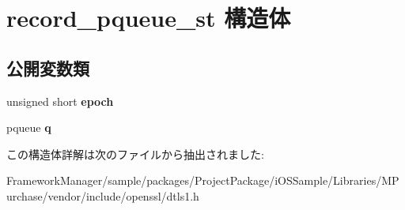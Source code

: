 \hypertarget{structrecord__pqueue__st}{}\section{record\+\_\+pqueue\+\_\+st 構造体}
\label{structrecord__pqueue__st}
\subsection*{公開変数類}
\begin{DoxyCompactItemize}
\item 
\hypertarget{structrecord__pqueue__st_afac67173059e6a13ddfaad940046c5b4}{}unsigned short {\bfseries epoch}\label{structrecord__pqueue__st_afac67173059e6a13ddfaad940046c5b4}

\item 
\hypertarget{structrecord__pqueue__st_a5c5204a38f914cdd4d592cc7d591b83e}{}pqueue {\bfseries q}\label{structrecord__pqueue__st_a5c5204a38f914cdd4d592cc7d591b83e}

\end{DoxyCompactItemize}


この構造体詳解は次のファイルから抽出されました\+:\begin{DoxyCompactItemize}
\item 
Framework\+Manager/sample/packages/\+Project\+Package/i\+O\+S\+Sample/\+Libraries/\+M\+Purchase/vendor/include/openssl/dtls1.\+h\end{DoxyCompactItemize}

